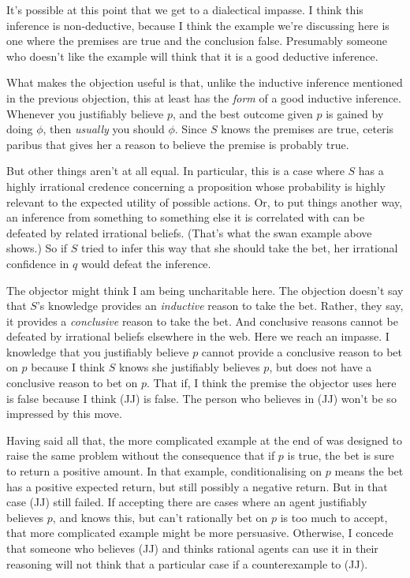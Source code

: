 {It's possible at this point that we get to a dialectical impasse. I think this inference is non-deductive, because I think the example we're discussing here is one where the premises are true and the conclusion false. Presumably someone who doesn't like the example will think that it is a good deductive inference.

What makes the objection useful is that, unlike the inductive inference mentioned in the previous objection, this at least has the \textit{form} of a good inductive inference. Whenever you justifiably believe \(p\), and the best outcome given \(p\) is gained by doing \(\phi\), then \textit{usually} you should \(\phi\). Since \(S\) knows the premises are true, ceteris paribus that gives her a reason to believe the premise is probably true.

But other things aren't at all equal. In particular, this is a case where \(S\) has a highly irrational credence concerning a proposition whose probability is highly relevant to the expected utility of possible actions. Or, to put things another way, an inference from something to something else it is correlated with can be defeated by related irrational beliefs. (That's what the swan example above shows.) So if \(S\) tried to infer this way that she should take the bet, her irrational confidence in \(q\) would defeat the inference.

The objector might think I am being uncharitable here. The objection doesn't say that \(S\)'s knowledge provides an \textit{inductive} reason to take the bet. Rather, they say, it provides a \textit{conclusive} reason to take the bet. And conclusive reasons cannot be defeated by irrational beliefs elsewhere in the web. Here we reach an impasse. I knowledge that you justifiably believe \(p\) cannot provide a conclusive reason to bet on \(p\) because I think \(S\) knows she justifiably believes \(p\), but does not have a conclusive reason to bet on \(p\). That if, I think the premise the objector uses here is false because I think (JJ) is false. The person who believes in (JJ) won't be so impressed by this move. 

Having said all that, the more complicated example at the end of \citet{Weatherson2005-WEACWD} was designed to raise the same problem without the consequence that if \(p\) is true, the bet is sure to return a positive amount. In that example, conditionalising on \(p\) means the bet has a positive expected return, but still possibly a negative return. But in that case (JJ) still failed. If accepting there are cases where an agent justifiably believes \(p\), and knows this, but can't rationally bet on \(p\) is too much to accept, that more complicated example might be more persuasive. Otherwise, I concede that someone who believes (JJ) and thinks rational agents can use it in their reasoning will not think that a particular case if a counterexample to (JJ).}

